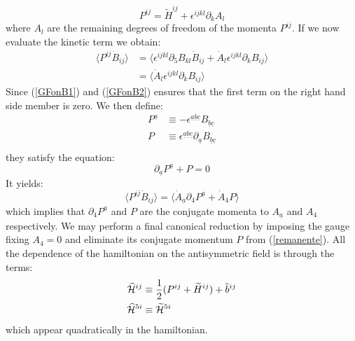 \documentclass[a4paper,12pt]{article}
\def\HCH{\widehat{\cal{H}}}
\def\c{\cal{C}}
\def\a{\underline{a}}
\def\b{\underline{b}}
\def\c{\underline{c}}
\begin{document}
\begin{equation}\label{}
P^{ij}=\widetilde{H}^{ij}+\epsilon^{ijkl}\partial_kA_l
\end{equation}
where $A_l$ are the remaining degrees of freedom of the momenta
$P^{ij}$. If we now evaluate the kinetic term we obtain:
\begin{equation*}\label{}
\begin{split}
\langle P^{ij}\dot{B}_{ij} \rangle &=\langle
\epsilon^{ijkl}\partial_5B_{kl}\dot{B}_{ij}+\dot{A}_l
\epsilon^{ijkl}\partial_kB_{ij} \rangle\\ &=\langle \dot{A}_l
\epsilon^{ijkl}\partial_kB_{ij} \rangle
\end{split}
\end{equation*}
Since (\ref{GFonB1}) and (\ref{GFonB2}) ensures that the first
term on the right hand side member is zero. We then define:
\begin{equation*}\label{}
\begin{split}
P^{\a}&\equiv -\epsilon^{\a\b\c}B_{\b\c}\\
P&\equiv\epsilon^{\a\b\c}\partial_{\a}B_{\b\c}\\
\end{split}
\end{equation*}
they satisfy the equation:
\begin{equation}\label{remanente}
\partial_{\a}P^{\a}+P=0
\end{equation}
It yields:
\begin{equation*}\label{}
\langle P^{ij}
\dot{B}_{ij}\rangle=\langle\dot{A}_{\a}\partial_4P^{\a}+\dot{A}_4P
\rangle
\end{equation*}
which implies that $\partial_4P^{\a}$ and $P$ are the conjugate
momenta to $A_{\a}$ and $A_4$ respectively. We may perform a final
canonical reduction by imposing the gauge fixing $A_4=0$ and
eliminate its conjugate momentum $P$ from (\ref{remanente}). All
the dependence of the hamiltonian on the antisymmetric field is
through the terms:
\begin{equation*}\label{}
\begin{split}
{\HCH}^{ij}&\equiv {1\over 2} (P^{ij}+\widetilde{H}^{ij}) +\tilde{b}^{ij}\\
{\HCH}^{5i}&\equiv{\widetilde{\cal{H}}}^{5i}
\end{split}
\end{equation*}
which appear quadratically in the hamiltonian.
\end{document}
